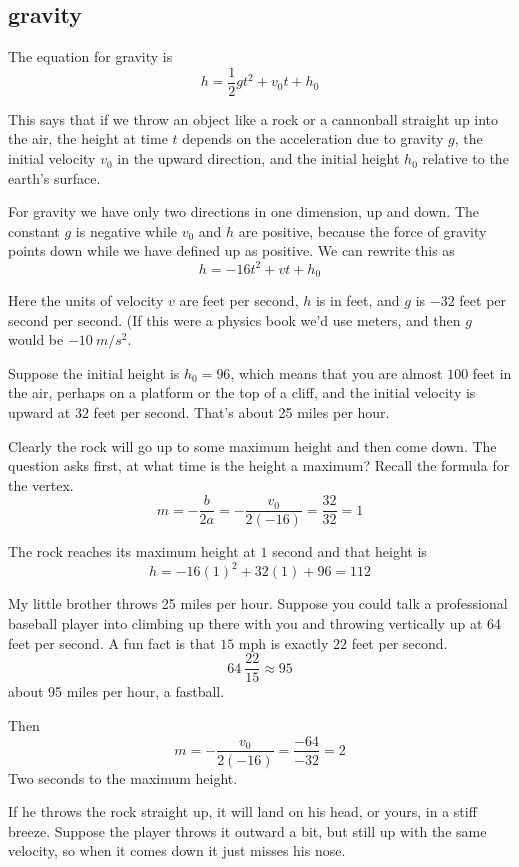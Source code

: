 \documentclass[11pt, oneside]{article}
\begin{document}
\subsection*{gravity}

The equation for gravity is
\[ h = \frac{1}{2}g t^2 + v_0 t + h_0 \]

This says that if we throw an object like a rock or a cannonball straight up into the air, the height at time $t$ depends on the acceleration due to gravity $g$, the initial velocity $v_0$ in the upward direction, and the initial height $h_0$ relative to the earth's surface.

For gravity we have only two directions in one dimension, up and down.  The constant $g$ is negative while $v_0$ and $h$ are positive, because the force of gravity points down while we have defined up as positive.  We can rewrite this as
\[ h = -16t^2 + vt + h_0 \]

Here the units of velocity $v$ are feet per second, $h$ is in feet, and $g$ is $-32$ feet per second per second.  (If this were a physics book we'd use meters, and then $g$ would be $-10 \ m/s^2$.

Suppose the initial height is $h_0 = 96$, which means that you are almost $100$ feet in the air, perhaps on a platform or the top of a cliff, and the initial velocity is upward at $32$ feet per second.  That's about 25 miles per hour.

Clearly the rock will go up to some maximum height and then come down.  The question asks first, at what time is the height a maximum?  Recall the formula for the vertex.
\[ m = -\frac{b}{2a} = -\frac{v_0}{2(-16)} = \frac{32}{32} = 1 \]

The rock reaches its maximum height at $1$ second and that height is
\[ h = -16(1)^2 + 32(1) + 96 = 112 \]

My little brother throws 25 miles per hour.  Suppose you could talk a professional baseball player into climbing up there with you and throwing vertically up at 64 feet per second.  A fun fact is that $15$ mph is exactly $22$ feet per second.
\[ 64 \ \frac{22}{15} \approx 95 \]
about 95 miles per hour, a fastball.

Then
\[ m = - \frac{v_0}{2(-16)} = \frac{-64}{-32} = 2 \]
Two seconds to the maximum height.

If he throws the rock straight up, it will land on his head, or yours, in a stiff breeze.  Suppose the player throws it outward a bit, but still up with the same velocity, so when it comes down it just misses his nose.  
\end{document}
